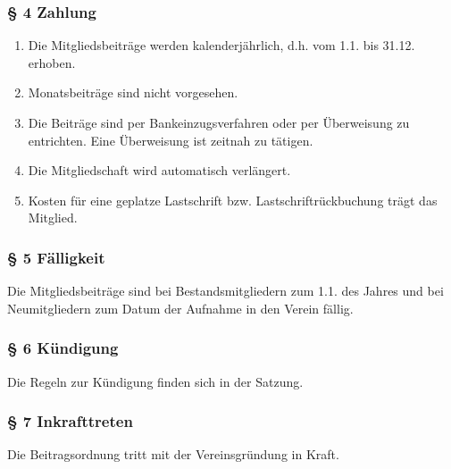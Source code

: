 \documentclass[a4paper,10pt]{article}
\begin{document}
\subsubsection*{§ 4 Zahlung}
\begin{enumerate}
  \item Die Mitgliedsbeiträge werden kalenderjährlich, d.h. vom 1.1. bis 31.12. erhoben.
  \item Monatsbeiträge sind nicht vorgesehen.
  \item Die Beiträge sind per Bankeinzugsverfahren oder per Überweisung zu entrichten.
Eine Überweisung ist zeitnah zu tätigen.
\item Die Mitgliedschaft wird automatisch verlängert.
\item Kosten für eine geplatze Lastschrift bzw. Lastschriftrückbuchung trägt das
Mitglied.
\end{enumerate}

\subsubsection*{§ 5 Fälligkeit}
Die Mitgliedsbeiträge sind bei Bestandsmitgliedern zum 1.1. des Jahres und bei
Neumitgliedern zum Datum der Aufnahme in den Verein fällig.

\subsubsection*{§ 6 Kündigung}
Die Regeln zur Kündigung finden sich in der Satzung.

\subsubsection*{§ 7 Inkrafttreten}
Die Beitragsordnung tritt mit der Vereinsgründung in Kraft.
\end{document}
